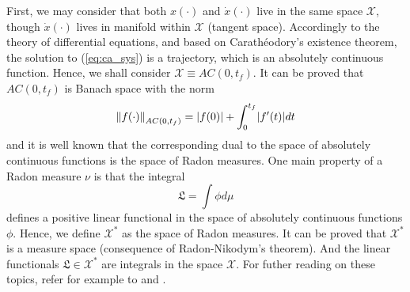 \documentclass[11pt,letterpaper]{article}
\newcommand{\X}{{\mathcal{X}}}
\let\originalleft\left
\let\originalright\right
\renewcommand{\left}{\mathopen{}\mathclose\bgroup\originalleft}
\renewcommand{\right}{\aftergroup\egroup\originalright}
\newcommand{\norm}[1]{\left\lVert#1\right\rVert}
\theoremstyle{definition}
\begin{document}
First, we may consider that both $x(\cdot)$ and $\dot{x}(\cdot)$ live in the same space $\X$, though $\dot{x}(\cdot)$ lives in manifold within $\X$ (tangent space). Accordingly to the theory of differential equations, and based on Carathéodory's existence theorem, the solution to (\ref{eq:ca_sys}) is a trajectory, which is an absolutely continuous function. Hence, we shall consider $\X\equiv AC(0,t_f)$. It can be proved that $AC(0,t_f)$ is Banach space with the norm
\[
\norm{f(\cdot)}_{AC(0,t_f)} = |f(0)|+\int_0^{t_f}\left|f'(t)\right|dt
\]
and it is well known that the corresponding dual to the space of absolutely continuous functions is the space of Radon measures. One main property of a Radon measure $\nu$ is that the integral
\[
\mathfrak{L} = \int \phi d\mu
\]
defines a positive linear functional in the space of absolutely continuous functions $\phi$. Hence, we define $\X^*$ as the space of Radon measures. It can be proved that $\X^*$ is a measure space (consequence of Radon-Nikodym's theorem). And the linear functionals $\mathfrak{L}\in\X^*$ are integrals in the space $\X$. For futher reading on these topics, refer for example to \cite{aliprantis1998principles} and \cite{bourbaki2003integration}.



\end{document}
